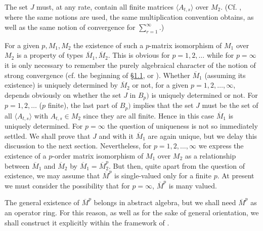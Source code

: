 \documentclass[b5paper,twoside]{article}
\newcommand{\secref}[2]{\hyperref[#1]{\mbox{\S#2}}}
\theoremstyle{mvnplain}
\newcommand{\M}{\mathbf M}
\def\M{M}%
\def\mathfrak#1{#1}%
\begin{document}
The set $\mathfrak J$ must, at any rate, contain all finite matrices
$\langle A_{t,s}\rangle$ over $\M_2$.  (Cf. \cite[pp.~136--137,
Lemma~2.4.3]{ref5}, where the same notions are used, the same multiplication
convention obtains, as well as the same notion of convergence for
$\sum_{r=1}^{\infty}$.)

For a given $p,\M_1,\M_2$ the existence of such a $p$-matrix isomorphism of
$\M_1$ over $\M_2$ is a property of types $\overline{\M}_1,\overline{\M}_2$.
This is obvious for $p=1,2,\ldots$ while for $p=\infty$ it is only necessary to
remember the purely algebraical character of the notion of strong convergence
(cf. the beginning of \secref{sec:1.1}{1.1}, or \cite[Theorem~II]{ref9}).
Whether $\overline{\M}_1$ (assuming its existence) is uniquely determined by
$\overline{\M}_2$ or not, for a given $p=1,2,\ldots,\infty$, depends obviously
on whether the set $\mathfrak J$ in $B_p)$ is uniquely determined or not.  For
$p=1,2,\ldots$ ($p$ finite), the last part of $B_p)$ implies that the set
$\mathfrak J$ must be the set of all $\langle A_{t,s}\rangle$ with
$A_{t,s}\in\M_2$ since they are all finite.  Hence in this case
$\overline{\M}_1$ is uniquely determined.  For $p=\infty$ the question of
uniqueness is not so immediately settled.  We shall prove that $\mathfrak J$
and with it $\overline{\M}_1$ are again unique, but we delay this discussion to
the next section.  Nevertheless, for $p=1,2,\ldots,\infty$ we express the
existence of a $p$-order matrix isomorphism of $\M_1$ over $\M_2$ as a
relationship between $\overline{\M}_1$ and $\overline{\M}_2$ by
$\overline{\M}_1=\overline{\M}_2^{p}$.  But then, quite apart from the question
of existence, we may assume that $\overline{\M}^{p}$ is single-valued only for
a finite $p$.  At present we must consider the possibility that for
$p=\infty$, $\overline{\M}^{p}$ is many valued.

The general existence of $\overline{\M}^{p}$ belongs in abstract algebra, but
we shall need $\overline{\M}^{p}$ as an operator ring.  For this reason, as well
as for the sake of general orientation, we shall construct it explicitly within
the framework of \cite[pp.~135--137, \S2.4]{ref5}.
\end{document}
